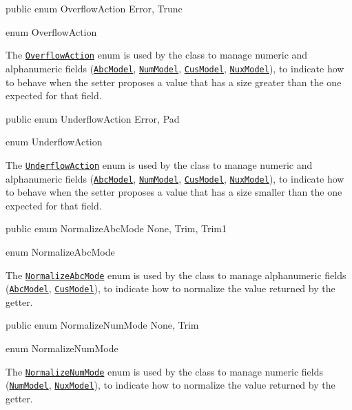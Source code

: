 \begin{elisting}
\begin{javacode}
public enum OverflowAction { Error, Trunc }
\end{javacode}
\caption{enum OverflowAction}\label{lst:OverflowAction}
\end{elisting}
The \hyperref[lst:OverflowAction]{\texttt{OverflowAction}} enum is used by the 
class to manage numeric and alphanumeric fields 
(\hyperref[lst:AbcModel]{\texttt{AbcModel}},
\hyperref[lst:NumModel]{\texttt{NumModel}},
\hyperref[lst:CusModel]{\texttt{CusModel}},
\hyperref[lst:NuxModel]{\texttt{NuxModel}}), to indicate how to behave when the 
setter proposes a value that has a size greater than the one expected for that 
field.

\begin{elisting}
\begin{javacode}
public enum UnderflowAction { Error, Pad }
\end{javacode}
\caption{enum UnderflowAction}\label{lst:UnderflowAction}
\end{elisting}
The \hyperref[lst:UnderflowAction]{\texttt{UnderflowAction}} enum is used by the 
class to manage numeric and alphanumeric fields 
(\hyperref[lst:AbcModel]{\texttt{AbcModel}},
\hyperref[lst:NumModel]{\texttt{NumModel}},
\hyperref[lst:CusModel]{\texttt{CusModel}},
\hyperref[lst:NuxModel]{\texttt{NuxModel}}), to indicate how to behave when the 
setter proposes a value that has a size smaller than the one expected for that 
field.

\begin{elisting}
\begin{javacode}
public enum NormalizeAbcMode { None, Trim, Trim1 }
\end{javacode}
\caption{enum NormalizeAbcMode}\label{lst:NormalizeAbcMode}
\end{elisting}
The \hyperref[lst:NormalizeAbcMode]{\texttt{NormalizeAbcMode}} enum is used by 
the class to manage alphanumeric fields 
(\hyperref[lst:AbcModel]{\texttt{AbcModel}},
\hyperref[lst:CusModel]{\texttt{CusModel}}), to indicate how to normalize the 
value returned by the getter.

\begin{elisting}
\begin{javacode}
public enum NormalizeNumMode { None, Trim }
\end{javacode}
\caption{enum NormalizeNumMode}\label{lst:NormalizeNumMode}
\end{elisting}
The \hyperref[lst:NormalizeNumMode]{\texttt{NormalizeNumMode}} enum is used by 
the class to manage numeric fields (\hyperref[lst:NumModel]{\texttt{NumModel}},
\hyperref[lst:NuxModel]{\texttt{NuxModel}}), to indicate how to normalize the 
value returned by the getter.

